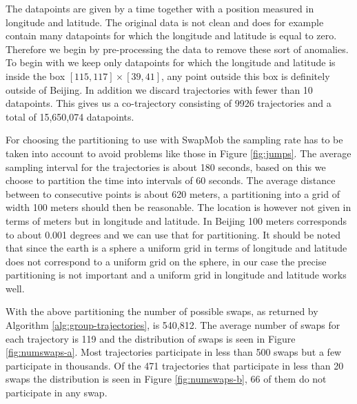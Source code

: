 \documentclass[12pt]{article}
\theoremstyle{definition}
\begin{document}
The datapoints are given by a time together with a position measured
in longitude and latitude. The original data is not clean and does for
example contain many datapoints for which the longitude and latitude
is equal to zero. Therefore we begin by pre-processing the data to
remove these sort of anomalies. To begin with we keep only datapoints
for which the longitude and latitude is inside the box
\([115, 117] \times [39, 41]\), any point outside this box is
definitely outside of Beijing. In addition we discard trajectories
with fewer than 10 datapoints. This gives us a co-trajectory
consisting of 9926 trajectories and a total of 15,650,074 datapoints.

For choosing the partitioning to use with SwapMob the sampling rate
has to be taken into account to avoid problems like those in Figure
\ref{fig:jumps}. The average sampling interval for the trajectories is
about 180 seconds, based on this we choose to partition the time into
intervals of 60 seconds. The average distance between to consecutive
points is about 620 meters, a partitioning into a grid of width 100
meters should then be reasonable. The location is however not given in
terms of meters but in longitude and latitude. In Beijing 100 meters
corresponds to about 0.001 degrees and we can use that for
partitioning. It should be noted that since the earth is a sphere a
uniform grid in terms of longitude and latitude does not correspond to
a uniform grid on the sphere, in our case the precise partitioning is
not important and a uniform grid in longitude and latitude works well.

With the above partitioning the number of possible swaps, as returned
by Algorithm \ref{alg:group-trajectories}, is 540,812. The average
number of swaps for each trajectory is 119 and the distribution of
swaps is seen in Figure \ref{fig:numswaps-a}. Most trajectories
participate in less than 500 swaps but a few participate in thousands.
Of the 471 trajectories that participate in less than 20 swaps the
distribution is seen in Figure \ref{fig:numswaps-b}, 66 of them do not
participate in any swap.
\end{document}
